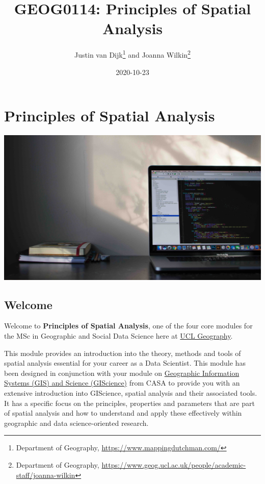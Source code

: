 \documentclass[
]{book}
\title{GEOG0114: Principles of Spatial Analysis}
\author{Justin van Dijk\footnote{Department of Geography, \url{https://www.mappingdutchman.com/}} and Joanna Wilkin\footnote{Department of Geography, \url{https://www.geog.ucl.ac.uk/people/academic-staff/joanna-wilkin}}}
\date{2020-10-23}
\begin{document}
\maketitle

{
\setcounter{tocdepth}{1}
\tableofcontents
}
\hypertarget{principles-of-spatial-analysis}{%
\chapter*{Principles of Spatial Analysis}\label{principles-of-spatial-analysis}}

\begin{center}\includegraphics[width=1\linewidth]{images/general/data_science_welcome_sm} \end{center}

\hypertarget{welcome}{%
\section*{Welcome}\label{welcome}}

Welcome to \textbf{Principles of Spatial Analysis}, one of the four core modules for the MSc in Geographic and Social Data Science here at \href{https://www.geog.ucl.ac.uk/}{UCL Geography}.

This module provides an introduction into the theory, methods and tools of spatial analysis essential for your career as a Data Scientist.
This module has been designed in conjunction with your module on \href{https://www.ucl.ac.uk/module-catalogue/modules/geographic-information-systems-and-science-CASA0005}{Geographic Information Systems (GIS) and Science (GIScience)} from CASA to provide you with an extensive introduction into GIScience, spatial analysis and their associated tools. It has a specific focus on the principles, properties and parameters that are part of spatial analysis and how to understand and apply these effectively within geographic and data science-oriented research.
\end{document}
